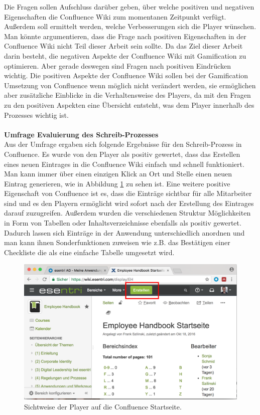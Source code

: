 \documentclass[a4paper,12pt]{scrartcl}
\begin{document}
Die Fragen sollen Aufschluss darüber geben, über welche positiven und negativen Eigenschaften die Confluence Wiki zum momentanen Zeitpunkt verfügt. Außerdem soll ermittelt werden, welche Verbesserungen sich die Player wünschen. Man könnte argumentieren, dass die Frage nach positiven Eigenschaften in der Confluence Wiki nicht Teil dieser Arbeit sein sollte. Da das Ziel dieser Arbeit darin besteht, die negativen Aspekte der Confluence Wiki mit Gamification zu optimieren. Aber gerade deswegen sind Fragen nach positiven Eindrücken wichtig. Die positiven Aspekte der Confluence Wiki sollen bei der Gamification Umsetzung von Confluence wenn möglich nicht verändert werden, sie ermöglichen aber zusätzliche Einblicke in die Verhaltensweise des Players, da mit den Fragen zu den positiven Aspekten eine Übersicht entsteht, was dem Player innerhalb des Prozesses wichtig ist.
\\\\
\textbf{Umfrage Evaluierung des Schreib-Prozesses}\\
Aus der Umfrage ergaben sich folgende Ergebnisse für den Schreib-Prozess in Confluence. Es wurde von den Player als positiv gewertet, dass das Erstellen eines neuen Eintrages in die Confluence Wiki einfach und schnell funktioniert. Man kann immer über einen einzigen Klick an Ort und Stelle einen neuen Eintrag generieren, wie in Abbildung \ref{ConfluenceEintragErstellen} zu sehen ist. Eine weitere positive Eigenschaft von Confluence ist es, dass die Einträge sichtbar für alle Mitarbeiter sind und es den Playern ermöglicht wird sofort nach der Erstellung des Eintrages darauf zuzugreifen. Außerdem wurden die verschiedenen Struktur Möglichkeiten in Form von Tabellen oder Inhaltsverzeichnisse ebenfalls als positiv gewertet. Dadurch lassen sich Einträge in der Anwendung unterschiedlich anordnen und man kann ihnen Sonderfunktionen zuweisen wie z.B. das Bestätigen einer Checkliste die als eine einfache Tabelle umgesetzt wird.
\begin{figure}[h!]
\begin{center}
\includegraphics[scale = 0.4]{Bilder/ConfluenceStart.eps}
\caption{Sichtweise der Player auf die Confluence Startseite.}
\label{ConfluenceEintragErstellen}
\end{center}
\end{figure} 
\end{document}
